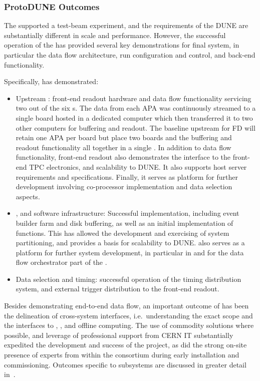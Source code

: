 \subsubsection{ProtoDUNE Outcomes}

The   supported a test-beam experiment, and the requirements of the DUNE  are substantially different in scale and performance.
However, the successful operation of the   has provided several key demonstrations for final system, in particular the data flow architecture, run configuration and control, and back-end functionality.

Specifically,  has demonstrated: 
\begin{itemize}
\item Upstream : front-end readout hardware and data flow functionality servicing two out of the six s.
  The data from each APA was continuously streamed to a single  board hosted in a dedicated computer which then transferred it to two other computers for buffering and readout.
  The baseline upstream  for  FD will retain one APA per  board but place two  boards and the buffering and readout functionality all together in a single . 
  In addition to data flow functionality,  front-end readout also demonstrates the interface to the front-end TPC electronics, and scalability to DUNE. It also supports host server requirements and specifications. Finally, it serves as platform for further development involving co-processor implementation and data selection aspects.
\item {},  and software infrastructure:
 Successful  implementation, including event builder
  farm and disk buffering, as well as an initial implementation of  functions. This has allowed the
  development and exercising of system partitioning, and provides a
  basis for scalability to DUNE.  also serves as
  a platform for further system development, in particular in  and for the data flow orchestrator part of the
  .
\item Data selection and timing: successful operation of the timing
  distribution system, and external trigger distribution to the
  front-end readout.
\end{itemize}

Besides demonstrating end-to-end data flow, an important outcome of
 has been the delineation of cross-system
interfaces, i.e.~understanding the exact  scope and the interfaces to , , and offline computing. The use of commodity solutions
where possible, and leverage of professional support from CERN IT 
substantially expedited the development and success of the project, as
did the strong on-site presence of experts from within the consortium during early installation and
commissioning. 
Outcomes specific to  subsystems are discussed in
greater detail in~\cite{Hennessy:CDRReview}. 


